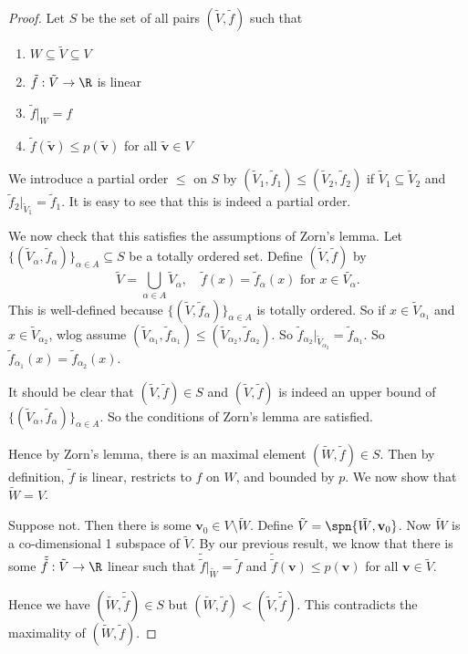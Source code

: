 \documentclass[a4paper]{article}
\begin{document}
\begin{proof}
  Let $S$ be the set of all pairs $(\tilde{V}, \tilde{f})$ such that
  \begin{enumerate}
    \item $W\subseteq \tilde{V}\subseteq V$
    \item $\tilde{f}: \tilde{V} \to \R$ is linear
    \item $\tilde{f}|_W = f$
    \item $\tilde{f}(\tilde{\mathbf{v}}) \leq p(\tilde{\mathbf{v}})$ for all $\tilde{\mathbf{v}} \in V$
  \end{enumerate}

  We introduce a partial order $\leq$ on $S$ by $(\tilde{V}_1, \tilde{f}_1) \leq (\tilde{V}_2, \tilde{f}_2)$ if $\tilde{V}_1 \subseteq \tilde{V}_2$ and $\tilde{f}_2 |_{\tilde{V}_1} = \tilde{f}_1$. It is easy to see that this is indeed a partial order.

  We now check that this satisfies the assumptions of Zorn's lemma. Let $\{(\tilde{V}_\alpha, \tilde{f}_\alpha)\}_{\alpha\in A} \subseteq S$ be a totally ordered set. Define $(\tilde{V}, \tilde{f})$ by
  \[
    \tilde{V} = \bigcup_{\alpha\in A} \tilde{V}_\alpha,\quad \tilde{f}(x) = \tilde{f}_\alpha(x)\text{ for }x\in \tilde{V_\alpha}.
  \]
  This is well-defined because $\{(\tilde{V}, \tilde{f}_\alpha)\}_{\alpha\in A}$ is totally ordered. So if $x\in \tilde{V}_{\alpha_1}$ and $x \in \tilde{V}_{\alpha_2}$, wlog assume $(\tilde{V}_{\alpha_1}, \tilde{f}_{\alpha_1}) \leq (\tilde{V}_{\alpha_2}, \tilde{f}_{\alpha_2})$. So $\tilde{f}_{\alpha_2}|_{\tilde{V}_{\alpha_2}} = \tilde{f}_{\alpha_1}$. So $\tilde{f}_{\alpha_1}(x) = \tilde{f}_{\alpha_2}(x)$.

  It should be clear that $(\tilde{V}, \tilde{f})\in S$ and $(\tilde{V}, \tilde{f})$ is indeed an upper bound of $\{(\tilde{V}_\alpha, \tilde{f}_\alpha)\}_{\alpha\in A}$. So the conditions of Zorn's lemma are satisfied.

  Hence by Zorn's lemma, there is an maximal element $(\tilde{W}, \tilde{f}) \in S$. Then by definition, $\tilde{f}$ is linear, restricts to $f$ on $W$, and bounded by $p$. We now show that $\tilde{W} = V$.

  Suppose not. Then there is some $\mathbf{v}_0 \in V\setminus \tilde{W}$. Define $\tilde{V} = \spn\{\tilde{W}, \mathbf{v}_0\}$. Now $\tilde{W}$ is a co-dimensional 1 subspace of $\tilde{V}$. By our previous result, we know that there is some $\tilde{\tilde{f}}: \tilde{V} \to \R$ linear such that $\tilde{\tilde{f}}|_{\tilde{W}} = \tilde{f}$ and $\tilde{\tilde{f}}(\mathbf{v}) \leq p(\mathbf{v})$ for all $\mathbf{v}\in \tilde{V}$.

  Hence we have $(\tilde{W}, \tilde{\tilde{f}}) \in S$ but $(\tilde{W}, \tilde{f}) < (\tilde{V}, \tilde{\tilde{f}})$. This contradicts the maximality of $(\tilde{W}, \tilde{f})$.
\end{proof}
\end{document}
